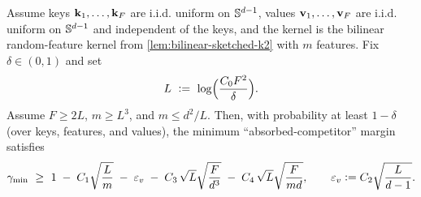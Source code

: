 \begin{theorem}\label{thm:combined-rkrv}
Assume keys \({\mathbf{k}}_{1},\dots,{\mathbf{k}}_{F}\) are i.i.d. uniform on \(\mathbb{S}^{d-1}\), values \({\mathbf{v}}_{1},\dots,{\mathbf{v}}_{F}\) are i.i.d. uniform on \(\mathbb{S}^{d-1}\) and independent of the keys, and the kernel is the bilinear random-feature kernel from \cref{lem:bilinear-sketched-k2} with $m$ features.
Fix \(\delta\in(0,1)\) and set
\[
L\ \vcentcolon=\ \log\!\Big(\frac{C_{0} F^2}{\delta}\Big).
\]
Assume $F \ge 2L$, $m \ge L^3$, and $m\le d^2/L$. Then, with probability at least \(1-\delta\) (over keys, features, and values), the minimum ``absorbed-competitor'' margin satisfies
\begin{equation}
\gamma_{\min}
\ \ge\
1
\;-\;
C_{1}\sqrt{\frac{L}{m}}
\;-\;
\varepsilon_{v}
\;-\;
C_{3}\,\sqrt{L}\sqrt{\frac{F}{d^3}}
\;-\;
C_{4}\,\sqrt{L}\sqrt{\frac{F}{md}},
\qquad
\varepsilon_{v}\vcentcolon= C_{2}\sqrt{\frac{L}{d-1}}.
\label{eq:app:rkrv:sketchedk2_full}
\end{equation}
\end{theorem}


